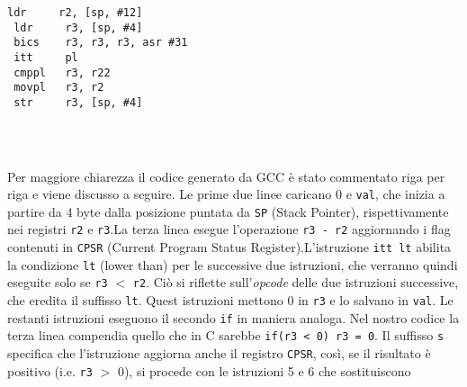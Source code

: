 %    

\lstset{style=cstyle}
\begin{minipage}{.565\textwidth}
  
\end{minipage}
\hfill
\begin{minipage}{.435\textwidth}
 \begin{lstlisting}[stepnumber=0, frame=ltb]
 ldr     r2, [sp, #12]
 ldr     r3, [sp, #4]
 bics    r3, r3, r3, asr #31
 itt     pl
 cmppl   r3, r22
 movpl   r3, r2
 str     r3, [sp, #4]




 \end{lstlisting}
\end{minipage}
Per maggiore chiarezza il codice generato da GCC è stato commentato riga per 
riga e viene discusso a seguire. \newline
Le prime due linee caricano 0 e \verb|val|, che inizia a partire da 4 byte 
dalla posizione puntata da \verb|SP| (Stack Pointer), rispettivamente nei 
registri \verb|r2| e \verb|r3|.\newline La terza linea esegue l'operazione 
\verb|r3 - r2| aggiornando i flag contenuti in \verb|CPSR| (Current Program 
Status Register).\newline L'istruzione \verb|itt lt| abilita la condizione 
\verb|lt| (lower than) per le successive due istruzioni, che verranno quindi 
eseguite solo se \verb|r3| $<$ \verb|r2|. Ciò si riflette sull'\emph{opcode}
delle due istruzioni successive, che eredita il suffisso \verb|lt|. Quest 
istruzioni mettono 0 in \verb|r3| e lo salvano in \verb|val|. \newline
Le restanti istruzioni eseguono il secondo \verb|if| in maniera analoga.\newline
Nel nostro codice la terza linea compendia quello che in C sarebbe 
\verb|if(r3 < 0) r3 = 0|. Il suffisso \verb|s| specifica che l'istruzione 
aggiorna anche il registro \verb|CPSR|, così, se il risultato è positivo (i.e. 
\verb|r3| $>$ 0), si procede con le istruzioni 5 e 6 che sostituiscono 
